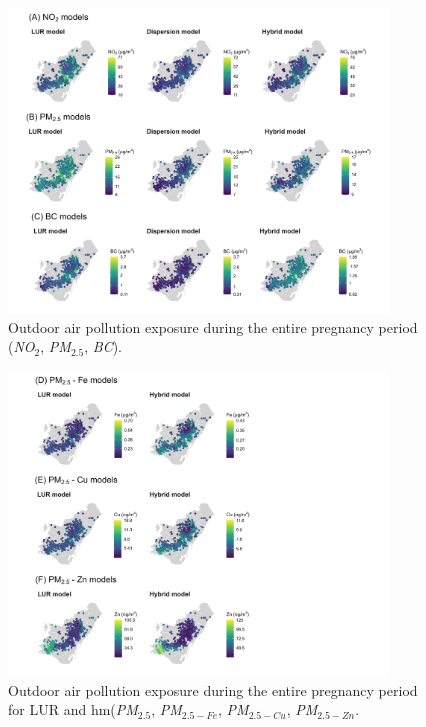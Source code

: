 \documentclass{article}
\begin{document}
\captionsetup[figure]{skip=6pt}
\begin{figure}[!htb]
\includegraphics[width=0.9\textwidth]{figures/combined_figure1.png}
\caption{Outdoor air pollution exposure during the entire pregnancy period (\textit{NO$_2$}, \textit{PM$_{2.5}$}, \textit{BC}).}
\label{fig2}
\end{figure}

\captionsetup[figure]{skip=6pt}
\begin{figure}[!htb]
\includegraphics[width=0.9\textwidth]{figures/combined_figure2.png}
\caption{Outdoor air pollution exposure during the entire pregnancy period for LUR and hm(\textit{PM$_{2.5}$}, \textit{PM$_{2.5-Fe}$}, \textit{PM$_{2.5-Cu}$}, \textit{PM$_{2.5-Zn}$}.}
\label{fig3}
\end{figure}
\end{document}
